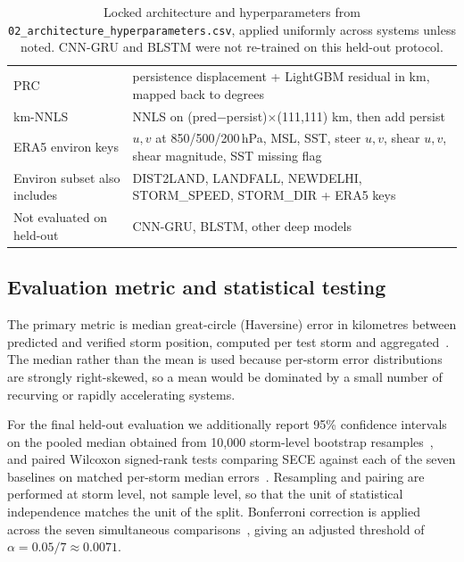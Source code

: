 \documentclass{ametsocv6.1}
\newcommand{\sece}{SECE}
\begin{document}
\begin{table}[ht]
\begin{tabular}{@{}p{}p{}@{}}
PRC & persistence displacement + LightGBM residual in km, mapped back to degrees \\
km-NNLS & NNLS on (pred$-$persist)$\times$(111,111) km, then add persist \\
ERA5 environ keys & $u,v$ at 850/500/200\,hPa, MSL, SST, steer $u,v$, shear $u,v$, shear magnitude, SST missing flag \\
Environ subset also includes & DIST2LAND, LANDFALL, NEWDELHI, STORM\_SPEED, STORM\_DIR + ERA5 keys \\
Not evaluated on held-out & CNN-GRU, BLSTM, other deep models \\
\bottomrule
\end{tabular}
\caption{Locked architecture and hyperparameters from
\texttt{02\_architecture\_hyperparameters.csv}, applied uniformly across systems
unless noted. CNN-GRU and BLSTM were not re-trained on this held-out protocol.}
\label{tab:hyp}
\end{table}

\subsection{Evaluation metric and statistical testing}
The primary metric is median great-circle (Haversine) error in kilometres between
predicted and verified storm position, computed per test storm and
aggregated~\citep{sinnott1984}. The median rather than the mean
is used because per-storm error distributions are strongly right-skewed, so a
mean would be dominated by a small number of recurving or rapidly accelerating
systems.

For the final held-out evaluation we additionally report 95\% confidence
intervals on the pooled median obtained from 10{,}000 storm-level bootstrap
resamples~\citep{efron1979}, and paired Wilcoxon
signed-rank tests comparing \sece{} against each of the seven baselines on
matched per-storm median errors~\citep{wilcoxon1945}. Resampling
and pairing are performed at storm level, not sample level, so that the unit of
statistical independence matches the unit of the split. Bonferroni correction is
applied across the seven simultaneous
comparisons~\citep{bonferroni1936}, giving an adjusted threshold of
$\alpha = 0.05/7 \approx 0.0071$.
\end{document}
